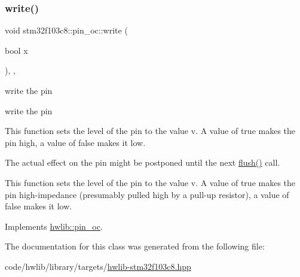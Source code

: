 \subsubsection{\texorpdfstring{write()}{write()}}
{\footnotesize\ttfamily void stm32f103c8\+::pin\+\_\+oc\+::write (\begin{DoxyParamCaption}\item[{bool}]{x }\end{DoxyParamCaption})\hspace{0.3cm}{\ttfamily [inline]}, {\ttfamily [override]}, {\ttfamily [virtual]}}





write the pin

write the pin

This function sets the level of the pin to the value v. A value of true makes the pin high, a value of false makes it low.

The actual effect on the pin might be postponed until the next \hyperlink{classstm32f103c8_1_1pin__oc_ac86dbc1c7430d2dbdee190ee87b2e35e}{flush()} call.

This function sets the level of the pin to the value v. A value of true makes the pin high-\/impedance (presumably pulled high by a pull-\/up resistor), a value of false makes it low. 

Implements \hyperlink{classhwlib_1_1pin__oc_a4429dd7dc80858a213bb157f4ac5def3}{hwlib\+::pin\+\_\+oc}.



The documentation for this class was generated from the following file\+:\begin{DoxyCompactItemize}
\item 
code/hwlib/library/targets/\hyperlink{hwlib-stm32f103c8_8hpp}{hwlib-\/stm32f103c8.\+hpp}\end{DoxyCompactItemize}
